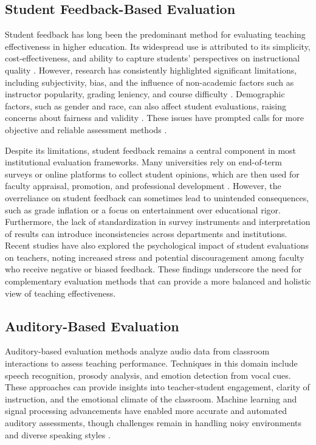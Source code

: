 
\subsection{Student Feedback-Based Evaluation}
Student feedback has long been the predominant method for evaluating teaching effectiveness in higher education. Its widespread use is attributed to its simplicity, cost-effectiveness, and ability to capture students' perspectives on instructional quality \cite{Ajmal2024, Husain2016}. However, research has consistently highlighted significant limitations, including subjectivity, bias, and the influence of non-academic factors such as instructor popularity, grading leniency, and course difficulty \cite{Heffernan2022, carvalho2022biases}. Demographic factors, such as gender and race, can also affect student evaluations, raising concerns about fairness and validity \cite{Steinberg2021}. These issues have prompted calls for more objective and reliable assessment methods \cite{Ginsburg2022NecessaryBI}.

Despite its limitations, student feedback remains a central component in most institutional evaluation frameworks. Many universities rely on end-of-term surveys or online platforms to collect student opinions, which are then used for faculty appraisal, promotion, and professional development \cite{8615171}. However, the overreliance on student feedback can sometimes lead to unintended consequences, such as grade inflation or a focus on entertainment over educational rigor. Furthermore, the lack of standardization in survey instruments and interpretation of results can introduce inconsistencies across departments and institutions. Recent studies have also explored the psychological impact of student evaluations on teachers, noting increased stress and potential discouragement among faculty who receive negative or biased feedback. These findings underscore the need for complementary evaluation methods that can provide a more balanced and holistic view of teaching effectiveness.

\subsection{Auditory-Based Evaluation}
Auditory-based evaluation methods analyze audio data from classroom interactions to assess teaching performance. Techniques in this domain include speech recognition, prosody analysis, and emotion detection from vocal cues. These approaches can provide insights into teacher-student engagement, clarity of instruction, and the emotional climate of the classroom. Machine learning and signal processing advancements have enabled more accurate and automated auditory assessments, though challenges remain in handling noisy environments and diverse speaking styles \cite{Wang2022, Yang2022}.

